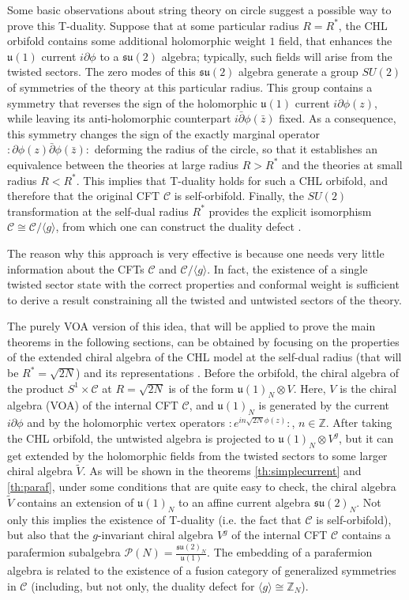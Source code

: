 \documentclass[11pt,reqno]{article}
\newcommand{\calC}{\mathcal{C}}
\newcommand{\ZZ}{\mathbb{Z}}
\newcommand{\paraf}{\mathcal{P}}
\newcommand{\nord}[1]{:\!\! #1\!\!:}
\newcommand{\alg}[1]{\mathfrak{#1}}
\begin{document}
Some basic observations about string theory on circle suggest a possible way to prove this T-duality. Suppose that at some particular radius $R=R^*$, the CHL orbifold contains some additional holomorphic weight $1$ field, that enhances the $\alg{u}(1)$ current $i\partial \phi$ to a $\alg{su}(2)$ algebra; typically, such fields will arise from the twisted sectors.  The zero modes of this $\alg{su}(2)$ algebra generate a group $SU(2)$ of symmetries of the theory at this particular radius. This group contains a symmetry that reverses the sign of the holomorphic $\alg{u}(1)$ current $i\partial \phi(z)$, while leaving its anti-holomorphic counterpart $i\bar\partial\phi(\bar z)$ fixed. As a consequence, this symmetry changes the sign of the exactly marginal operator $\nord{\partial \phi(z)\bar\partial\phi(\bar z)}$ deforming the radius of the circle, so that it establishes an equivalence between the theories at large radius $R>R^*$ and the theories at small radius $R<R^*$. This implies that T-duality holds for such a CHL orbifold, and therefore that the original CFT  $\calC$ is self-orbifold. Finally, the $SU(2)$ transformation at the self-dual radius $R^*$ provides the explicit isomorphism $\calC\cong \calC/\langle g\rangle$, from which one can construct the duality defect \cite{Volpato:2024goy}.

The reason why this approach is very effective is because one needs very little information about the CFTs $\calC$ and $\calC/\langle g\rangle$. In fact, the existence of a single twisted sector state with the  correct properties and conformal weight is sufficient to derive a result constraining  all the twisted and untwisted sectors of the theory.

The purely VOA version of this idea, that will be applied to prove the main theorems in the following sections, can be obtained by focusing on the properties of the extended chiral algebra of the CHL model at the self-dual radius (that will be $R^*=\sqrt{2N}$) and its representations \cite{Paquette:2017xui,Volpato:2024goy}. Before the orbifold,   the chiral algebra of the product $S^1\times \calC$ at $R=\sqrt{2N}$ is of the form $\alg{u}(1)_N\otimes V$. Here, $V$ is the chiral algebra (VOA) of the internal CFT $\calC$, and $\alg{u}(1)_N$ is generated by the current $i\partial\phi$ and by the holomorphic vertex operators $\nord{e^{in\sqrt{2N}\phi(z)}}$, $n\in \ZZ$. After taking the CHL orbifold, the untwisted algebra is projected to $\alg{u}(1)_N\otimes V^g$, but it can get  extended by the holomorphic fields from the twisted sectors to some larger chiral algebra $\tilde V$. As will be shown in the theorems \ref{th:simplecurrent} and \ref{th:paraf}, under some conditions that are quite easy to check, the chiral algebra $\tilde V$ contains an extension of $\alg{u}(1)_N$ to an affine current algebra $\alg{su}(2)_N$. Not only this implies the existence of T-duality (i.e. the fact that $\calC$ is self-orbifold), but also that the $g$-invariant chiral algebra $V^g$ of the internal CFT $\calC$ contains a parafermion subalgebra $\paraf(N)=\frac{\alg{su}(2)_N}{\alg{u}(1)}$. The embedding of a parafermion algebra is related to the existence of a fusion category of generalized symmetries in $\calC$ (including, but not only,  the duality defect for $\langle g\rangle\cong \ZZ_N$). 
\end{document}

